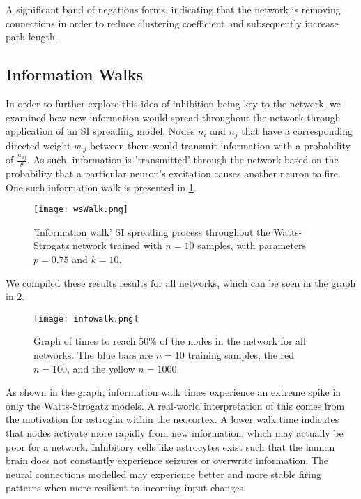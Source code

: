 A significant band of negations forms, indicating that the network is removing
connections in order to reduce clustering coefficient and subsequently increase
path length.

\subsection{Information Walks}

In order to further explore this idea of inhibition being key to the network, we
examined how new information would spread throughout the network through
application of an SI spreading model. Nodes $n_i$ and $n_j$ that have a
corresponding directed weight $w_{ij}$ between them would transmit information
with a probability of $\frac{w_{ij}}{\theta}$. As such, information is
'transmitted' through the network based on the probability that a particular
neuron's excitation causes another neuron to fire. One such information walk is
presented in \ref{fig:wsWalk}.

\begin{figure}[h]
    \centering
    \texttt{[image: wsWalk.png]}
    \caption{
        'Information walk' SI spreading process throughout the Watts-Strogatz
        network trained with $n=10$ samples, with parameters $p=0.75$ and
        $k=10$.
    }
    \label{fig:wsWalk}
\end{figure}

We compiled these results results for all networks, which can be seen in the
graph in \ref{fig:infowalk}.

\begin{figure}[h]
    \centering
    \texttt{[image: infowalk.png]}
    \caption{
        Graph of times to reach 50\% of the nodes in the network for all
        networks. The blue bars are $n=10$ training samples, the red $n=100$,
        and the yellow $n=1000$.
    }
    \label{fig:infowalk}
\end{figure}

As shown in the graph, information walk times experience an extreme spike in
only the Watts-Strogatz models. A real-world interpretation of this comes from
the motivation for astroglia within the neocortex. A lower walk time indicates
that nodes activate more rapidly from new information, which may actually be
poor for a network. Inhibitory cells like astrocytes exist such that the human
brain does not constantly experience seizures or overwrite information. The
neural connections modelled may experience better and more stable firing
patterns when more resilient to incoming input changes.


